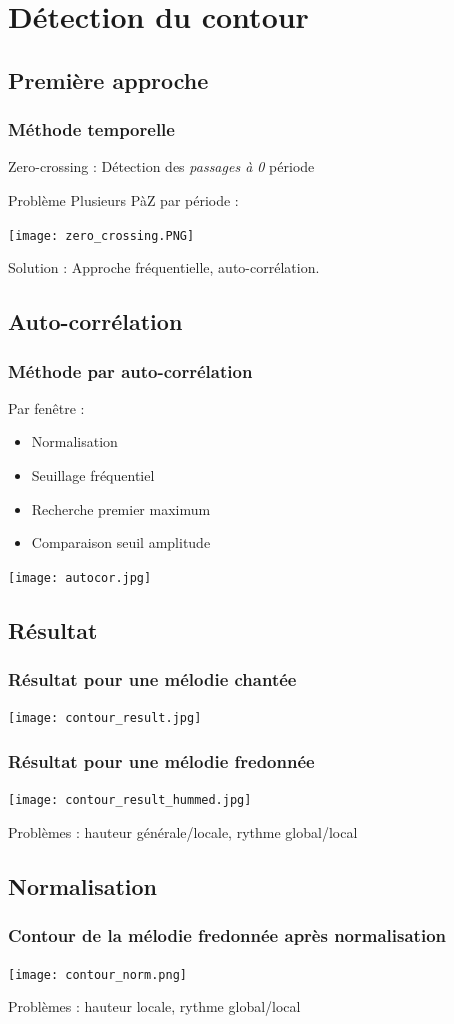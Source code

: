 \documentclass{beamer}
\begin{document}
\section{Détection du contour}
	\subsection{Première approche}
		\begin{frame}
			\frametitle{Méthode temporelle}
			Zero-crossing : Détection des \textit{passages à 0} \textrightarrow  période
			\begin{alertblock}{Problème} %
				Plusieurs PàZ par période :
			\end{alertblock}
			\centering \texttt{[image: zero\_crossing.PNG]}
			
			Solution : Approche fréquentielle, auto-corrélation.
		\end{frame}
	\subsection{Auto-corrélation}
		\begin{frame}
			\frametitle{Méthode par auto-corrélation}
			Par fenêtre :
			\begin{itemize}
				\item Normalisation
				\item Seuillage fréquentiel
				\item Recherche premier maximum
				\item Comparaison seuil amplitude
			\end{itemize}
			\centering \texttt{[image: autocor.jpg]}
		\end{frame}
	\subsection{Résultat}
		\begin{frame}
			\frametitle{Résultat pour une mélodie chantée}
			\texttt{[image: contour\_result.jpg]}
		\end{frame}
		\begin{frame}
			\frametitle{Résultat pour une mélodie fredonnée}
			\texttt{[image: contour\_result\_hummed.jpg]}
			
			\textrightarrow Problèmes : hauteur générale/locale, rythme global/local
		\end{frame}
\subsection{Normalisation}
	\begin{frame}
		\frametitle{Contour de la mélodie fredonnée après normalisation}
		\texttt{[image: contour\_norm.png]}
		
		\textrightarrow Problèmes : hauteur locale, rythme global/local
	\end{frame}
\end{document}
